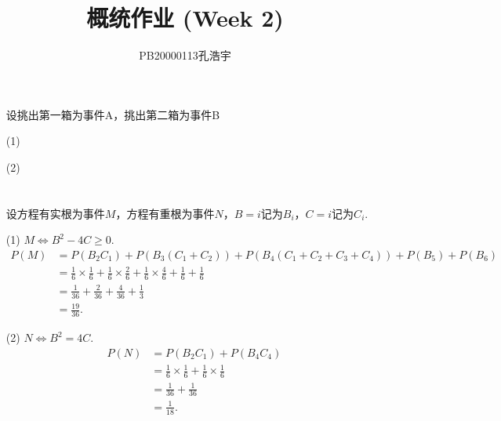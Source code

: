 \documentclass{article}
\title{概统作业 (Week 2)}
\author{PB20000113孔浩宇}
\begin{document}
\maketitle
\section{}  %
\begin{enumerate}
    \item []设挑出第一箱为事件A，挑出第二箱为事件B
    \item [(1)]
    \item [(2)]
\end{enumerate}

\section{}  %
\begin{enumerate}
    \item []设方程有实根为事件$M$，方程有重根为事件$N$，$B=i$记为$B_i$，$C=i$记为$C_i$.
    \item [(1)]$M\Leftrightarrow B^2-4C\geq 0$.
    \begin{align*}
        P(M)
        & = 
        P(B_2 C_1) + P(B_3 (C_1+C_2)) + P(B_4 (C_1 + C_2 + C_3 + C_4))+P(B_5)+P(B_6)\\
        & =
        \frac{1}{6}\times \frac{1}{6} + \frac{1}{6}\times \frac{2}{6} +
        \frac{1}{6}\times \frac{4}{6} + \frac{1}{6} + \frac{1}{6} \\
        & =
        \frac{1}{36} + \frac{2}{36} + \frac{4}{36} + \frac{1}{3}\\
        & =
        \frac{19}{36}.
    \end{align*}
    \item [(2)]$N\Leftrightarrow B^2 = 4C$.
    \begin{align*}
        P(N)
        & =
        P(B_2 C_1) + P(B_4 C_4)\\
        & =
        \frac{1}{6}\times\frac{1}{6} + \frac{1}{6}\times \frac{1}{6}\\
        & =
        \frac{1}{36} + \frac{1}{36}\\
        & =
        \frac{1}{18}.
    \end{align*}
\end{enumerate}
\end{document}
